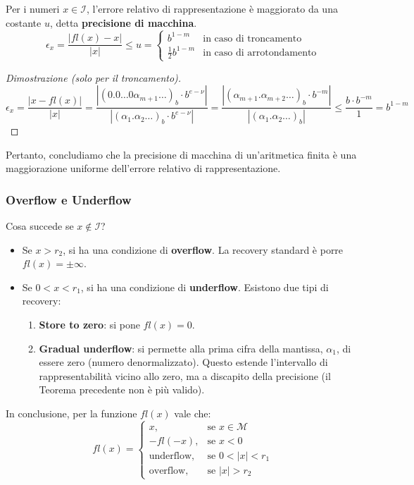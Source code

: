 \begin{teorema}
Per i numeri $x \in \mathcal{I}$, l'errore relativo di rappresentazione è maggiorato da una costante $u$, detta \textbf{precisione di macchina}.
$$ \epsilon_x = \frac{|fl(x)-x|}{|x|} \le u = 
\begin{cases} 
b^{1-m} & \text{in caso di troncamento} \\
\frac{1}{2}b^{1-m} & \text{in caso di arrotondamento}
\end{cases}
$$
\end{teorema}
\begin{proof}[Dimostrazione (solo per il troncamento)]
$$ \epsilon_x = \frac{|x-fl(x)|}{|x|} = \frac{|(0.0 \dots 0 \alpha_{m+1} \dots)_b \cdot b^{e-\nu}|}{|(\alpha_1 . \alpha_2 \dots)_b \cdot b^{e-\nu}|} = \frac{|(\alpha_{m+1}.\alpha_{m+2}\dots)_b \cdot b^{-m}|}{|(\alpha_1.\alpha_2\dots)_b|} \le \frac{b \cdot b^{-m}}{1} = b^{1-m} $$
\end{proof}

\begin{osservazione}
    Pertanto, concludiamo che la precisione di macchina di un'aritmetica finita è una maggiorazione uniforme dell'errore relativo di rappresentazione.
    \end{osservazione}

\subsubsection{Overflow e Underflow}
Cosa succede se $x \notin \mathcal{I}$?
\begin{itemize}
    \item Se $x > r_2$, si ha una condizione di \textbf{overflow}. La recovery standard è porre $fl(x) = \pm\infty$.
    \item Se $0 < x < r_1$, si ha una condizione di \textbf{underflow}. Esistono due tipi di recovery:
    \begin{enumerate}
        \item \textbf{Store to zero}: si pone $fl(x) = 0$.
        \item \textbf{Gradual underflow}: si permette alla prima cifra della mantissa, $\alpha_1$, di essere zero (numero denormalizzato). Questo estende l'intervallo di rappresentabilità vicino allo zero, ma a discapito della precisione (il Teorema precedente non è più valido).
    \end{enumerate}
\end{itemize}

In conclusione, per la funzione $fl(x)$ vale che:
\[
fl(x) = 
\begin{cases} 
x, & \text{se } x \in \mathcal{M} \\
-fl(-x), & \text{se } x < 0 \\
\text{underflow}, & \text{se } 0 < |x| < r_1 \\
\text{overflow}, & \text{se } |x| > r_2
\end{cases}
\]

